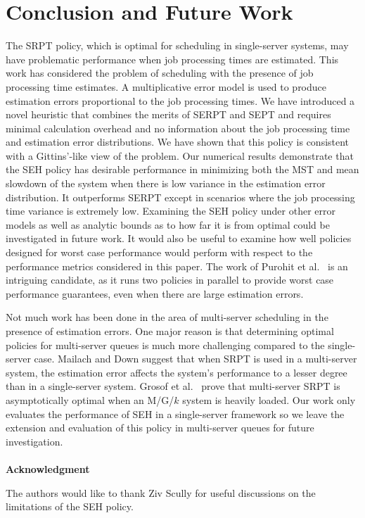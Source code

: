 \section{Conclusion and Future Work} \label{Conclusion}

The SRPT policy, which is optimal for scheduling in single-server systems, may have problematic performance when job processing times are estimated. This work has considered the problem of scheduling with the presence of job processing time estimates. A multiplicative error model is used to produce estimation errors proportional to the job processing times. We have introduced a novel heuristic that combines the merits of SERPT and SEPT and requires minimal calculation overhead and no information about the job processing time and estimation error distributions. We have shown that this policy is consistent with a Gittins'-like view of the problem. Our numerical results demonstrate that the SEH policy has desirable performance in minimizing both the MST and mean slowdown of the system when there is low variance in the estimation error distribution. It outperforms SERPT except in scenarios where the job processing time variance is extremely low. Examining the SEH policy under other error models as well as analytic bounds as to how far it is from optimal could be investigated in future work. It would also be useful to examine how well policies designed for worst case performance would perform with respect to the performance metrics considered in this paper. The work of Purohit et al.\ \cite{purohit2018improving} is an intriguing candidate, as it runs two policies in parallel to provide worst case performance guarantees, even when there are large estimation errors.

Not much work has been done in the area of multi-server scheduling in the presence of estimation errors. One major reason is that determining optimal policies for multi-server queues is much more challenging compared to the single-server case. Mailach and Down \cite{mailach2017scheduling} suggest that when SRPT is used in a multi-server system, the estimation error affects the system's performance to a lesser degree than in a single-server system. Grosof et al.\ \cite{grosof2018srpt} prove that multi-server SRPT is asymptotically optimal when an M/G/$k$ system is heavily loaded. Our work only evaluates the performance of SEH in a single-server framework so we leave the extension and evaluation of this policy in multi-server queues for future investigation. \\
\\ \textbf{Acknowledgment}

The authors would like to thank Ziv Scully for useful discussions on the limitations of the SEH policy.